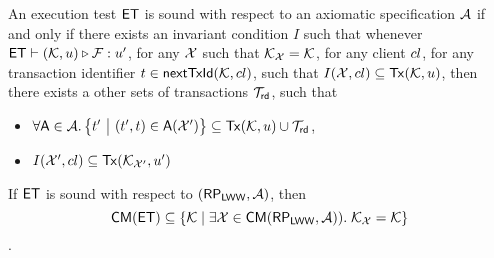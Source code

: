 \begin{definition}
\label{def:main-body-et_sound}
An execution test $\mathsf{ET}$ is sound with respect to an axiomatic 
specification $\mathcal{A}$ if and only if there exists an 
invariant condition $I$ such that whenever $\mathsf{ET} \vdash (\mathcal{K}, u) 
\triangleright \mathcal{F}: u'$, for any $\mathcal{X}$ such that 
$\mathcal{K}_{\mathcal{X}} = \mathcal{K}$, for any client ${cl}$, for any 
transaction identifier $t \in \mathsf{nextTxId}(\mathcal{K}, {cl})$, 
such that  $I(\mathcal{X}, {cl}) \subseteq \mathsf{Tx}(\mathcal{K}, u)$, then  
there exists a other sets of transactions $\mathcal{T}_{\mathsf{rd}}$, 
such that 
\begin{itemize}
\item $\forall \A \in \Ax. \Setcon{\txid' }{ (\txid', \txid) \in \A(\aexec')} \subseteq \Tx(\hh, \vi) \cup \T_{\rd}$, 
\item $I(\mathcal{X}', {cl}) \subseteq \mathsf{Tx}(\mathcal{K}_{\mathcal{X}'}, u')$
\end{itemize}
\end{definition}

\begin{theorem}
\label{thm:main-body-et_soundness}
If $\mathsf{ET}$ is sound with respect to $(\mathsf{RP}_{\mathsf{LWW}}, \mathcal{A})$, then 
\[
    \mathsf{CM}(\mathsf{ET}) \subseteq \{ \mathcal{K} \mid \exists \mathcal{X} \in \mathsf{CM}(\mathsf{RP}_{\mathsf{LWW}}, \mathcal{A})).\;\mathcal{K}_{\mathcal{X}} = \mathcal{K}\}
\].
\end{theorem}

